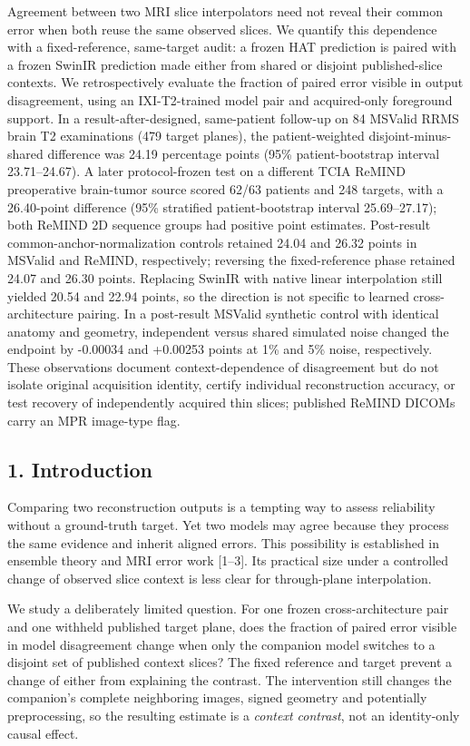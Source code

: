 \documentclass[
]{article}
\begin{document}
Agreement between two MRI slice interpolators need not reveal their
common error when both reuse the same observed slices. We quantify this
dependence with a fixed-reference, same-target audit: a frozen HAT
prediction is paired with a frozen SwinIR prediction made either from
shared or disjoint published-slice contexts. We retrospectively evaluate
the fraction of paired error visible in output disagreement, using an
IXI-T2-trained model pair and acquired-only foreground support. In a
result-after-designed, same-patient follow-up on 84 MSValid RRMS brain
T2 examinations (479 target planes), the patient-weighted
disjoint-minus-shared difference was 24.19 percentage points (95\%
patient-bootstrap interval 23.71--24.67). A later protocol-frozen test
on a different TCIA ReMIND preoperative brain-tumor source scored 62/63
patients and 248 targets, with a 26.40-point difference (95\% stratified
patient-bootstrap interval 25.69--27.17); both ReMIND 2D sequence groups
had positive point estimates. Post-result common-anchor-normalization
controls retained 24.04 and 26.32 points in MSValid and ReMIND,
respectively; reversing the fixed-reference phase retained 24.07 and
26.30 points. Replacing SwinIR with native linear interpolation still
yielded 20.54 and 22.94 points, so the direction is not specific to
learned cross-architecture pairing. In a post-result MSValid synthetic
control with identical anatomy and geometry, independent versus shared
simulated noise changed the endpoint by -0.00034 and +0.00253 points at
1\% and 5\% noise, respectively. These observations document
context-dependence of disagreement but do not isolate original
acquisition identity, certify individual reconstruction accuracy, or
test recovery of independently acquired thin slices; published ReMIND
DICOMs carry an MPR image-type flag.

\subsection{1. Introduction}\label{introduction}

Comparing two reconstruction outputs is a tempting way to assess
reliability without a ground-truth target. Yet two models may agree
because they process the same evidence and inherit aligned errors. This
possibility is established in ensemble theory and MRI error work
{[}1--3{]}. Its practical size under a controlled change of observed
slice context is less clear for through-plane interpolation.

We study a deliberately limited question. For one frozen
cross-architecture pair and one withheld published target plane, does
the fraction of paired error visible in model disagreement change when
only the companion model switches to a disjoint set of published context
slices? The fixed reference and target prevent a change of either from
explaining the contrast. The intervention still changes the companion's
complete neighboring images, signed geometry and potentially
preprocessing, so the resulting estimate is a \emph{context contrast},
not an identity-only causal effect.
\end{document}
